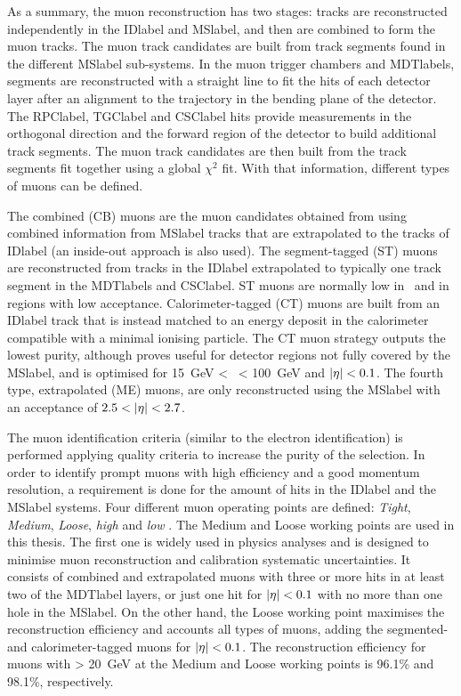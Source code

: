 As a summary, the muon reconstruction has two stages: tracks are reconstructed independently in the \acrshort{IDlabel} and \acrshort{MSlabel}, and then are combined to form the muon tracks. The muon track candidates are built from track segments found in the different \acrshort{MSlabel} sub-systems. In the muon trigger chambers and \acrshort{MDTlabel}s, segments are reconstructed with a straight line to fit the hits of each detector layer after an alignment to the trajectory in the bending plane of the detector. The \acrshort{RPClabel}, \acrshort{TGClabel} and \acrshort{CSClabel} hits provide measurements in the orthogonal direction and the forward region of the detector to build additional track segments. The muon track candidates are then built from the track segments fit together using a global $\chi^2$ fit. With that information, different types of muons can be defined.

The combined (CB) muons are the muon candidates obtained from using combined information from \acrshort{MSlabel} tracks that are extrapolated to the tracks of \acrshort{IDlabel} (an inside-out approach is also used). The segment-tagged (ST) muons are reconstructed from tracks in the \acrshort{IDlabel} extrapolated to typically one track segment in the \acrshort{MDTlabel}s and \acrshort{CSClabel}. ST muons are normally low in \pT\ and in regions with low acceptance. Calorimeter-tagged (CT) muons are built from an \acrshort{IDlabel} track that is instead matched to an energy deposit in the calorimeter compatible with a minimal ionising particle. The CT muon strategy outputs the lowest purity, although proves useful for detector regions not fully covered by the \acrshort{MSlabel}, and is optimised for 15~GeV < \pT\ < 100~GeV and $\abs{\eta}<0.1$. The fourth type, extrapolated (ME) muons, are only reconstructed using the \acrshort{MSlabel} with an acceptance of $2.5 < \abs{\eta} < 2.7$.

The muon identification criteria (similar to the electron identification) is performed applying quality criteria to increase the purity of the selection. In order to identify prompt muons with high efficiency and a
good momentum resolution, a requirement is done for the amount of hits in the \acrshort{IDlabel} and the \acrshort{MSlabel} systems. Four different muon operating points are defined: \textit{Tight}, \textit{Medium}, \textit{Loose}, \textit{high \pT} and \textit{low \pT}. The Medium and Loose working points are used in this thesis. The first one is widely used in physics analyses and is designed to minimise muon reconstruction and calibration systematic uncertainties. It consists of combined and extrapolated muons with three or more hits in at least two of the \acrshort{MDTlabel} layers, or just one hit for $\abs{\eta}<0.1$ with no more than one hole in the \acrshort{MSlabel}. On the other hand, the Loose working point maximises the reconstruction efficiency and accounts all types of muons, adding the segmented- and calorimeter-tagged muons for $\abs{\eta}<0.1$. The reconstruction efficiency for muons with \pT > 20~GeV at the Medium and Loose working points is 96.1\% and 98.1\%, respectively. 

